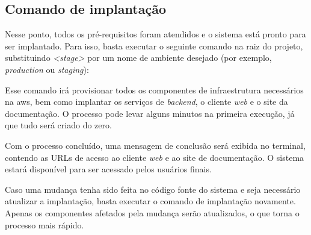 \subsection{Comando de implanta\c{c}\~ao}
\label{subsec:comandoDeImplantacao}

Nesse ponto, todos os pré-requisitos foram atendidos e o sistema está pronto para ser implantado. Para isso, basta executar o seguinte comando na raiz do projeto, substituindo \textit{<stage>} por um nome de ambiente desejado (por exemplo, \textit{production} ou \textit{staging}):


Esse comando irá provisionar todos os componentes de infraestrutura necessários na \gls{aws}, bem como implantar os serviços de \textit{backend}, o cliente \textit{web} e o site da documentação. O processo pode levar alguns minutos na primeira execução, já que tudo será criado do zero.

Com o processo concluído, uma mensagem de conclusão será exibida no terminal, contendo as URLs de acesso ao cliente \textit{web} e ao site de documentação. O sistema estará disponível para ser acessado pelos usuários finais.

Caso uma mudança tenha sido feita no código fonte do sistema e seja necessário atualizar a implantação, basta executar o comando de implantação novamente. Apenas os componentes afetados pela mudança serão atualizados, o que torna o processo mais rápido.

